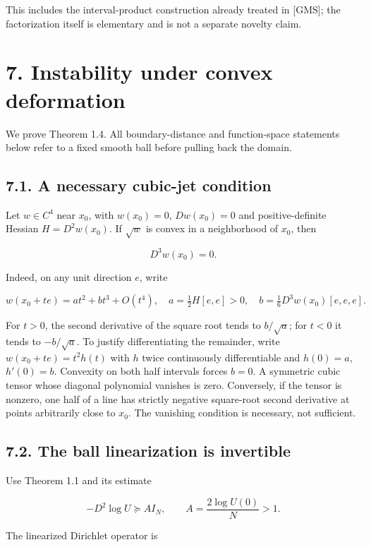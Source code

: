 \documentclass[11pt]{article}
\begin{document}
This includes the interval-product construction already treated in
{[}GMS{]}; the factorization itself is elementary and is not a separate
novelty claim.

\section{7. Instability under convex
deformation}\label{instability-under-convex-deformation}

We prove Theorem 1.4. All boundary-distance and function-space
statements below refer to a fixed smooth ball before pulling back the
domain.

\subsection{7.1. A necessary cubic-jet
condition}\label{a-necessary-cubic-jet-condition}

Let \(w\in C^4\) near \(x_0\), with \(w(x_0)=0\), \(Dw(x_0)=0\) and
positive-definite Hessian \(H=D^2w(x_0)\). If \(\sqrt w\) is convex in a
neighborhood of \(x_0\), then

\[D^3w(x_0)=0. \tag{D1}\]

Indeed, on any unit direction \(e\), write

\[w(x_0+te)=a t^2+b t^3+O(t^4),\quad
 a=\tfrac12H[e,e]>0,\quad b=\tfrac16D^3w(x_0)[e,e,e].\]

For \(t>0\), the second derivative of the square root tends to
\(b/\sqrt a\); for \(t<0\) it tends to \(-b/\sqrt a\). To justify
differentiating the remainder, write \(w(x_0+te)=t^2 h(t)\) with \(h\)
twice continuously differentiable and \(h(0)=a\), \(h'(0)=b\). Convexity
on both half intervals forces \(b=0\). A symmetric cubic tensor whose
diagonal polynomial vanishes is zero. Conversely, if the tensor is
nonzero, one half of a line has strictly negative square-root second
derivative at points arbitrarily close to \(x_0\). The vanishing
condition is necessary, not sufficient.

\subsection{7.2. The ball linearization is
invertible}\label{the-ball-linearization-is-invertible}

Use Theorem 1.1 and its estimate

\[-D^2\log U\succeq A I_N,\qquad A=\frac{2\log U(0)}N>1. \tag{D2}\]

The linearized Dirichlet operator is
\end{document}

